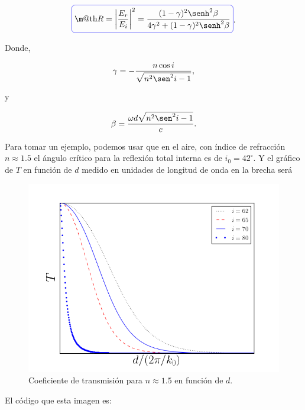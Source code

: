 \documentclass[a4paper,11pt]{article}
\makeatletter
\numberwithin{equation}{section}
\newcommand*{\boxcolor}{blue}
\renewcommand{\boxed}[1]{\textcolor{\boxcolor}{%
\tikz[baseline={([yshift=-1ex]current bounding box.center)}] \node [rectangle, minimum width=1ex,rounded corners,draw] {\normalcolor\m@th$\displaystyle#1$};}}
\makeatother
\begin{document}
\begin{equation}
 \boxed{R = \left|\frac{E_r}{E_i} \right|^2 = \frac{(1 - \gamma)^2\senh^2{\beta}}{4\gamma^2 + 
 (1 - \gamma)^2\senh^2{\beta}}}.
\end{equation}

Donde, 

\begin{equation}
 \gamma = - \frac{n\cos{i}}{\sqrt{n^2\sen^2{i} -1}},
\end{equation}

y

\begin{equation}
 \beta = \frac{\omega d \sqrt{n^2 \sen^2{i} -1}}{c}.
\end{equation}

Para tomar un ejemplo, podemos usar que en el aire, con índice de refracción 
$n \approx 1.5$ el ángulo crítico para la reflexión total interna es de $i_0 = 42^\circ$. 
Y el gráfico de $T$ en función de $d$ medido en unidades de longitud de onda en la 
brecha será 

\begin{figure}[H]
 \center 
 \includegraphics[scale=0.5]{problema2fig1}
 \caption{Coeficiente de transmisión para $n \approx 1.5$ en función de $d$.}
\end{figure}

El código que esta imagen es:
\end{document}
